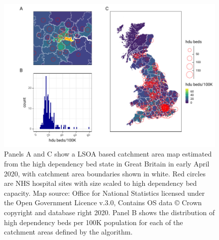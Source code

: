 \documentclass[twocolumn]{bmcart}%
\begin{document}
\begin{backmatter}
\begin{figure}[h!]
  \includegraphics{FIG2_HDU_UK_example}
  \caption{Panels A and C show a LSOA based catchment area map estimated from the high dependency bed state in Great 
Britain in early April 2020, with catchment area boundaries shown in white. Red circles are NHS hospital sites with 
size 
scaled to high dependency bed capacity. Map source: Office for National Statistics licensed under the Open Government 
Licence v.3.0, Contains OS data © Crown copyright and database right 2020. Panel B shows the distribution of high 
dependency beds per 100K population for each of the catchment areas defined by the algorithm.}
  \label{fig:two}
\end{figure}


\end{backmatter}
\end{document}
